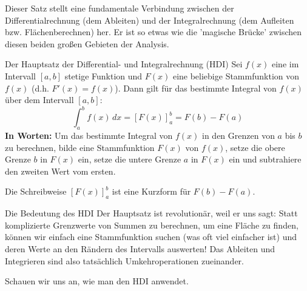 Dieser Satz stellt eine fundamentale Verbindung zwischen der Differentialrechnung (dem Ableiten) und der Integralrechnung (dem Aufleiten bzw. Flächenberechnen) her. Er ist so etwas wie die 'magische Brücke' zwischen diesen beiden großen Gebieten der Analysis.

\begin{merksatzumgebung}{Der Hauptsatz der Differential- und Integralrechnung (HDI)}
Sei $f(x)$ eine im Intervall $[a,b]$ stetige Funktion und $F(x)$ eine beliebige Stammfunktion von $f(x)$ (d.h. $F'(x) = f(x)$). Dann gilt für das bestimmte Integral von $f(x)$ über dem Intervall $[a,b]$:
\[ \int_{a}^{b} f(x) \,dx = [F(x)]_{a}^{b} = F(b) - F(a) \]
\textbf{In Worten:} Um das bestimmte Integral von $f(x)$ in den Grenzen von $a$ bis $b$ zu berechnen, bilde eine Stammfunktion $F(x)$ von $f(x)$, setze die obere Grenze $b$ in $F(x)$ ein, setze die untere Grenze $a$ in $F(x)$ ein und subtrahiere den zweiten Wert vom ersten.

Die Schreibweise $[F(x)]_{a}^{b}$ ist eine Kurzform für $F(b) - F(a)$.
\end{merksatzumgebung}

\begin{warumwichtigumgebung}{Die Bedeutung des HDI}
Der Hauptsatz ist revolutionär, weil er uns sagt: Statt komplizierte Grenzwerte von Summen zu berechnen, um eine Fläche zu finden, können wir einfach eine Stammfunktion suchen (was oft viel einfacher ist) und deren Werte an den Rändern des Intervalls auswerten! Das Ableiten und Integrieren sind also tatsächlich Umkehroperationen zueinander.
\end{warumwichtigumgebung}

Schauen wir uns an, wie man den HDI anwendet.

